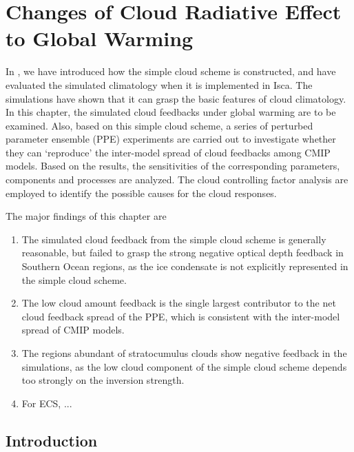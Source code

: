 \chapter{Changes of Cloud Radiative Effect to Global Warming}
\label{ch:cld_fbk}

In , we have introduced how the simple cloud scheme is constructed, and have evaluated the simulated climatology when it is implemented in Isca. The simulations have shown that it can grasp the basic features of cloud climatology. In this chapter, the simulated cloud feedbacks under global warming are to be examined. Also, based on this simple cloud scheme, a series of perturbed parameter ensemble (PPE) experiments are carried out to investigate whether they can `reproduce' the inter-model spread of cloud feedbacks among CMIP models. Based on the results, the sensitivities of the corresponding parameters, components and processes are analyzed. The cloud controlling factor analysis are employed to identify the possible causes for the cloud responses.

The major findings of this chapter are

\begin{enumerate}
    \item The simulated cloud feedback from the simple cloud scheme is generally reasonable, but failed to grasp the strong negative optical depth feedback in Southern Ocean regions, as the ice condensate is not explicitly represented in the simple cloud scheme.
    \item The low cloud amount feedback is the single largest contributor to the net cloud feedback spread of the PPE, which is consistent with the inter-model spread of CMIP models.
    \item The regions abundant of stratocumulus clouds show negative feedback in the simulations, as the low cloud component of the simple cloud scheme depends too strongly on the inversion strength.
    \item For ECS, ...
\end{enumerate}

\section{Introduction}
\label{sec:cld_fbk_chap_intro}

